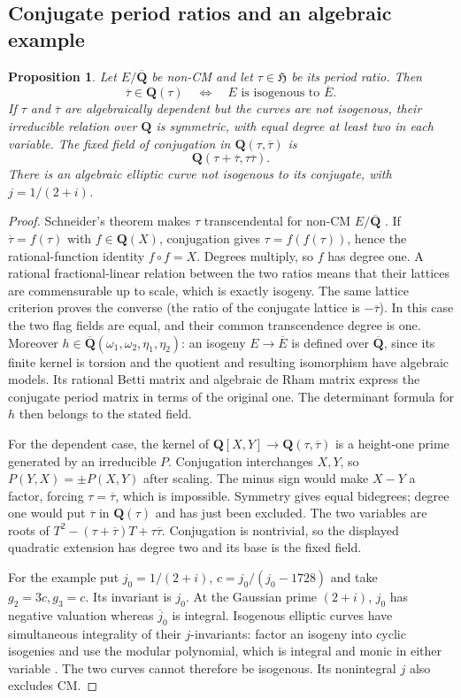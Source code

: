 \documentclass[11pt]{article}
\newtheorem{proposition}[theorem]{Proposition}
\theoremstyle{definition}\newtheorem{definition}[theorem]{Definition}
\theoremstyle{remark}\newtheorem{remark}[theorem]{Remark}
\newcommand{\Q}{\mathbf Q}\newcommand{\Z}{\mathbf Z}
\newcommand{\Qb}{\overline{\mathbf Q}}\newcommand{\Fp}{\mathbf F_p}
\begin{document}
\subsection{Conjugate period ratios and an algebraic example}
\begin{proposition}\label{prop:conjugate-ratio}
Let $E/\Qb$ be non-CM and let $\tau\in\mathfrak H$ be its period ratio. Then
\[
       \overline\tau\in\Q(\tau)
       \quad\Longleftrightarrow\quad E\text{ is isogenous to }\overline E.
\]
If $\tau$ and $\overline\tau$ are algebraically dependent but the curves are not isogenous, their irreducible relation over $\Q$ is symmetric, with equal degree at least two in each variable. The fixed field of conjugation in $\Q(\tau,\overline\tau)$ is
\[
                 \Q(\tau+\overline\tau,\tau\overline\tau).
\]
There is an algebraic elliptic curve not isogenous to its conjugate, with $j=1/(2+i)$.
\end{proposition}
\begin{proof}
Schneider's theorem makes $\tau$ transcendental for non-CM $E/\Qb$ \cite[Theorem IIc, p.~5]{Schneider}. If $\overline\tau=f(\tau)$ with $f\in\Q(X)$, conjugation gives $\tau=f(f(\tau))$, hence the rational-function identity $f\circ f=X$. Degrees multiply, so $f$ has degree one. A rational fractional-linear relation between the two ratios means that their lattices are commensurable up to scale, which is exactly isogeny. The same lattice criterion proves the converse (the ratio of the conjugate lattice is $-\overline\tau$). In this case the two flag fields are equal, and their common transcendence degree is one. Moreover $h\in\Qb(\omega_1,\omega_2,\eta_1,\eta_2)$: an isogeny $E\to\overline E$ is defined over $\Qb$, since its finite kernel is torsion and the quotient and resulting isomorphism have algebraic models. Its rational Betti matrix and algebraic de Rham matrix express the conjugate period matrix in terms of the original one. The determinant formula for $h$ then belongs to the stated field.

For the dependent case, the kernel of $\Q[X,Y]\to\Q(\tau,\overline\tau)$ is a height-one prime generated by an irreducible $P$. Conjugation interchanges $X,Y$, so $P(Y,X)=\pm P(X,Y)$ after scaling. The minus sign would make $X-Y$ a factor, forcing $\tau=\overline\tau$, which is impossible. Symmetry gives equal bidegrees; degree one would put $\overline\tau$ in $\Q(\tau)$ and has just been excluded. The two variables are roots of $T^2-(\tau+\overline\tau)T+\tau\overline\tau$. Conjugation is nontrivial, so the displayed quadratic extension has degree two and its base is the fixed field.

For the example put $j_0=1/(2+i)$, $c=j_0/(j_0-1728)$ and take $g_2=3c,g_3=c$. Its invariant is $j_0$. At the Gaussian prime $(2+i)$, $j_0$ has negative valuation whereas $\overline j_0$ is integral. Isogenous elliptic curves have simultaneous integrality of their $j$-invariants: factor an isogeny into cyclic isogenies and use the modular polynomial, which is integral and monic in either variable \cite[Theorem 6.1 and proof, pp.~88--90]{MilneMF}. The two curves cannot therefore be isogenous. Its nonintegral $j$ also excludes CM.
\end{proof}
\end{document}
